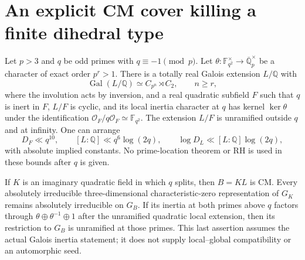 \section{An explicit CM cover killing a finite dihedral type}
\label{sec:cubic-dihedral-cm-cover}

\begin{proposition}
\label{AC-G73}
Let $p>3$ and $q$ be odd primes with $q\equiv-1\pmod p$.
Let $\theta:\mathbb F_{q^2}^{\times}\to\overline{\mathbb Q}_p^{\times}$
be a character of exact order $p^r>1$.
There is a totally real Galois extension $L/\mathbb Q$ with
\[
 \operatorname{Gal}(L/\mathbb Q)\simeq C_{p^n}\rtimes C_2,
 \qquad n\ge r,
                                                        \tag{G73.1}
\]
where the involution acts by inversion, and a real quadratic
subfield $F$ such that $q$ is inert in $F$, $L/F$ is cyclic,
and its local inertia character at $q$ has kernel
$\ker\theta$ under the identification
$\mathcal O_F/q\mathcal O_F\simeq\mathbb F_{q^2}$.
The extension $L/F$ is unramified outside $q$ and at infinity.
One can arrange
\[
 D_F\ll q^{10},\qquad [L:\mathbb Q]\ll q^6\log(2q),
 \qquad \log D_L\ll[L:\mathbb Q]\log(2q),             \tag{G73.2}
\]
with absolute implied constants. No prime-location theorem
or RH is used in these bounds after $q$ is given.

If $K$ is an imaginary quadratic field in which $q$ splits,
then $B=KL$ is CM. Every absolutely irreducible
three-dimensional characteristic-zero representation of
$G_K$ remains absolutely irreducible on $G_B$.
If its inertia at both primes above $q$ factors through
$\theta\oplus\theta^{-1}\oplus1$ after the unramified
quadratic local extension, then its restriction to $G_B$
is unramified at those primes. This last assertion assumes
the actual Galois inertia statement; it does not supply
local--global compatibility or an automorphic seed.
\end{proposition}

